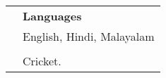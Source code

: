 \documentclass[letterpaper, 11pt]{article}
\begin{document}
\begin{longtable}{p{1.3in}p{4.8in}}
& \textbf{Languages} \\
& English, Hindi, Malayalam \\
& \\



\nohyphens{\color{OliveGreen}{Other interests}} & Cricket.\\


\end{longtable}
\end{document}
